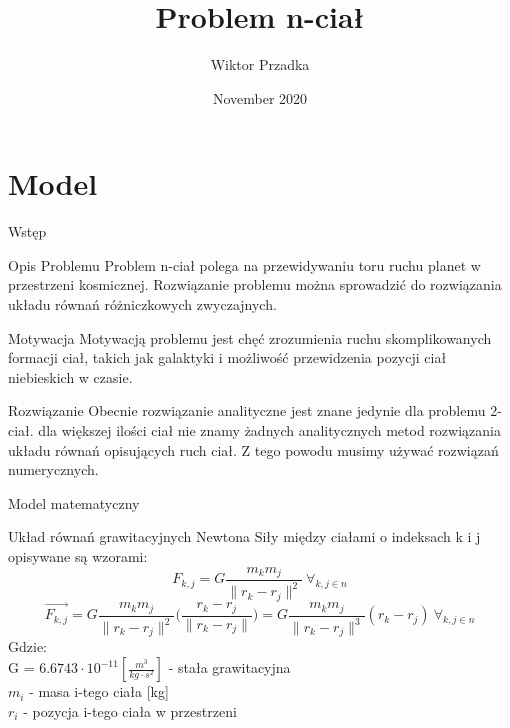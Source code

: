 \documentclass{beamer}
\title{Problem n-ciał}
\author{Wiktor Przadka}
\date{November 2020}
\begin{document}
\maketitle

\section{Model}

\begin{frame}{Wstęp}
    \begin{block}{Opis Problemu}
        Problem n-ciał polega na przewidywaniu toru ruchu planet w przestrzeni kosmicznej. Rozwiązanie problemu można sprowadzić do rozwiązania układu równań różniczkowych zwyczajnych.
    \end{block}
    \begin{block}{Motywacja}
        Motywacją problemu jest chęć zrozumienia ruchu skomplikowanych formacji ciał, takich jak galaktyki i możliwość przewidzenia pozycji ciał niebieskich w czasie.
    \end{block}
    \begin{block}{Rozwiązanie}
        Obecnie rozwiązanie analityczne jest znane jedynie dla problemu 2-ciał. dla większej ilości ciał nie znamy żadnych analitycznych metod rozwiązania układu równań opisujących ruch ciał. Z tego powodu musimy używać rozwiązań numerycznych.
    \end{block}
\end{frame}

\begin{frame}{Model matematyczny}
    \begin{block}{Układ równań grawitacyjnych Newtona}
        Siły między ciałami o indeksach k i j opisywane są wzorami:
        $$ F_{k,j} = G \frac{ m_{k} m_{j} }{ \| r_{k} - r_{j} \|^2 }\ \forall_{k, j \in n} $$
        $$ \vec{F_{k,j}} 
        = G \frac{ m_{k} m_{j} }{ \| r_{k} - r_{j} \|^2 } 
        \Big( \frac{ r_{k} - r_{j} }{\| r_{k} - r_{j} \|} \Big) 
        = G \frac{ m_{k} m_{j} }{ \| r_{k} - r_{j} \|^3 }(r_{k} - r_{j})\ \forall_{k, j \in n} $$
        Gdzie:\\
        G = $6.6743\cdot 10^{-11} [\frac{m^3}{kg \cdot s^2}]$ - stała grawitacyjna \\
        $m_{i}$ - masa i-tego ciała [kg]\\
        $r_{i}$ - pozycja i-tego ciała w przestrzeni\\
    \end{block}
\end{frame}
\end{document}

